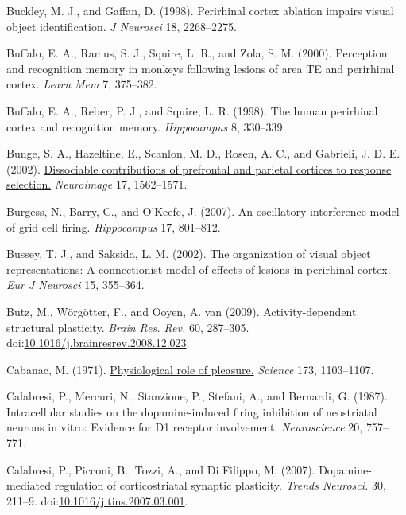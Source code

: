 \documentclass[
  11pt,
  a4paper,
]{scrbook}
\newlength{\cslhangindent}
\newenvironment{CSLReferences}[2] %
 {\begin{list}{}{%
  \setlength{\itemindent}{0pt}
  \setlength{\leftmargin}{0pt}
  \setlength{\parsep}{0pt}
  \ifodd #1
   \setlength{\leftmargin}{\cslhangindent}
   \setlength{\itemindent}{-1\cslhangindent}
  \fi
  \setlength{\itemsep}{#2\baselineskip}}}
 {\end{list}}
\begin{document}
\begin{CSLReferences}{1}{1}
Buckley, M. J., and Gaffan, D. (1998). Perirhinal cortex ablation
impairs visual object identification. \emph{J Neurosci} 18, 2268--2275.

Buffalo, E. A., Ramus, S. J., Squire, L. R., and Zola, S. M. (2000).
Perception and recognition memory in monkeys following lesions of area
TE and perirhinal cortex. \emph{Learn Mem} 7, 375--382.

Buffalo, E. A., Reber, P. J., and Squire, L. R. (1998). The human
perirhinal cortex and recognition memory. \emph{Hippocampus} 8,
330--339.

Bunge, S. A., Hazeltine, E., Scanlon, M. D., Rosen, A. C., and Gabrieli,
J. D. E. (2002).
\href{https://www.ncbi.nlm.nih.gov/pubmed/12414294}{Dissociable
contributions of prefrontal and parietal cortices to response
selection.} \emph{Neuroimage} 17, 1562--1571.

Burgess, N., Barry, C., and O'Keefe, J. (2007). An oscillatory
interference model of grid cell firing. \emph{Hippocampus} 17, 801--812.

Bussey, T. J., and Saksida, L. M. (2002). The organization of visual
object representations: A connectionist model of effects of lesions in
perirhinal cortex. \emph{Eur J Neurosci} 15, 355--364.

Butz, M., Wörgötter, F., and Ooyen, A. van (2009). {Activity-dependent
structural plasticity.} \emph{Brain Res. Rev.} 60, 287--305.
doi:\href{https://doi.org/10.1016/j.brainresrev.2008.12.023}{10.1016/j.brainresrev.2008.12.023}.

Cabanac, M. (1971).
\href{https://www.ncbi.nlm.nih.gov/pubmed/5098954}{Physiological role of
pleasure.} \emph{Science} 173, 1103--1107.

Calabresi, P., Mercuri, N., Stanzione, P., Stefani, A., and Bernardi, G.
(1987). Intracellular studies on the dopamine-induced firing inhibition
of neostriatal neurons in vitro: Evidence for D1 receptor involvement.
\emph{Neuroscience} 20, 757--771.

Calabresi, P., Picconi, B., Tozzi, A., and Di Filippo, M. (2007).
{Dopamine-mediated regulation of corticostriatal synaptic plasticity.}
\emph{Trends Neurosci.} 30, 211--9.
doi:\href{https://doi.org/10.1016/j.tins.2007.03.001}{10.1016/j.tins.2007.03.001}.


\end{CSLReferences}
\end{document}
